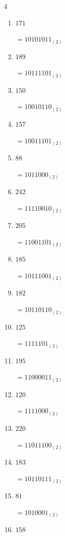 \begin{multicols}{4}
\begin{enumerate}
        $=11111001_{(2)}$

  \item $171$

        $=10101011_{(2)}$

  \item $189$

        $=10111101_{(2)}$

  \item $150$

        $=10010110_{(2)}$

  \item $157$

        $=10011101_{(2)}$

  \item $88$

        $=1011000_{(2)}$

  \item $242$

        $=11110010_{(2)}$

  \item $205$

        $=11001101_{(2)}$

  \item $185$

        $=10111001_{(2)}$

  \item $182$

        $=10110110_{(2)}$

  \item $125$

        $=1111101_{(2)}$

\columnbreak %

  \item $195$

        $=11000011_{(2)}$

  \item $120$

        $=1111000_{(2)}$

  \item $220$

        $=11011100_{(2)}$

  \item $183$

        $=10110111_{(2)}$

  \item $81$

        $=1010001_{(2)}$

  \item $158$


\end{enumerate}
\end{multicols}
